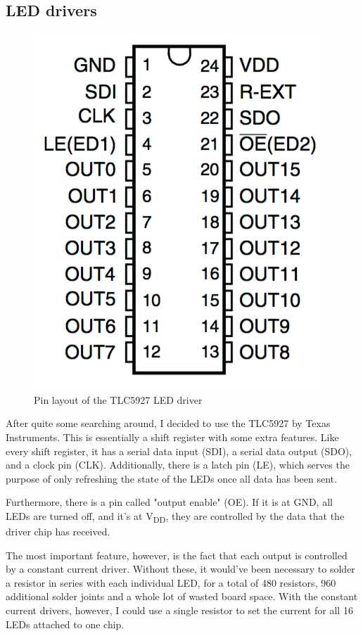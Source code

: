 \documentclass[a4paper, 11pt, titlepage]{report}
\def \vdd {V\textsubscript{DD}}
\begin{document}
\newpage
\subsection{LED drivers}


\begin{figure}

\includegraphics[scale=0.35]{./images/tlc-pins.png}
\caption{Pin layout of the TLC5927 LED driver}

\end{figure}

After quite some searching around, I decided to use the TLC5927 by Texas Instruments. This is
essentially a shift register with some extra features. Like every shift register, it has a serial
data input (SDI), a serial data output (SDO), and a clock pin (CLK). Additionally, there is a latch
pin (LE), which serves the purpose of only refreshing the state of the LEDs once all data has been
sent.

Furthermore, there is a pin called "output enable" (OE). If it is at GND, all LEDs are turned off,
and it's at \vdd, they are controlled by the data that the driver chip has received.

The most important feature, however, is the fact that each output is controlled by a constant
current driver. Without these, it would've been necessary to solder a resistor in series
with each individual LED, for a total of 480 resistors, 960 additional solder joints and a whole
lot of wasted board space. With the constant current drivers, however, I could use a single
resistor to set the current for all 16 LEDs attached to one chip. 
\end{document}

